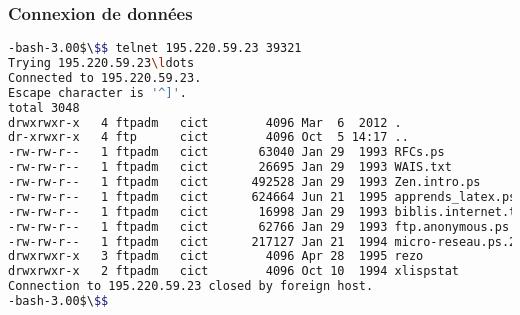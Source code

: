\documentclass[a4paper, 11pt]{article}
\begin{document}
	\subsubsection{Connexion de données}
\begin{lstlisting}[caption=connexion de contrôle, language=bash, basicstyle=\scriptsize\ttfamily]
-bash-3.00$\$$ telnet 195.220.59.23 39321
Trying 195.220.59.23\ldots
Connected to 195.220.59.23.
Escape character is '^]'.
total 3048
drwxrwxr-x   4 ftpadm   cict        4096 Mar  6  2012 .
dr-xrwxr-x   4 ftp      cict        4096 Oct  5 14:17 ..
-rw-rw-r--   1 ftpadm   cict       63040 Jan 29  1993 RFCs.ps
-rw-rw-r--   1 ftpadm   cict       26695 Jan 29  1993 WAIS.txt
-rw-rw-r--   1 ftpadm   cict      492528 Jan 29  1993 Zen.intro.ps
-rw-rw-r--   1 ftpadm   cict      624664 Jun 21  1995 apprends_latex.ps
-rw-rw-r--   1 ftpadm   cict       16998 Jan 29  1993 biblis.internet.txt
-rw-rw-r--   1 ftpadm   cict       62766 Jan 29  1993 ftp.anonymous.ps
-rw-rw-r--   1 ftpadm   cict      217127 Jan 21  1994 micro-reseau.ps.210194
drwxrwxr-x   3 ftpadm   cict        4096 Apr 28  1995 rezo
drwxrwxr-x   2 ftpadm   cict        4096 Oct 10  1994 xlispstat
Connection to 195.220.59.23 closed by foreign host.
-bash-3.00$\$$
\end{lstlisting}
\end{document}
